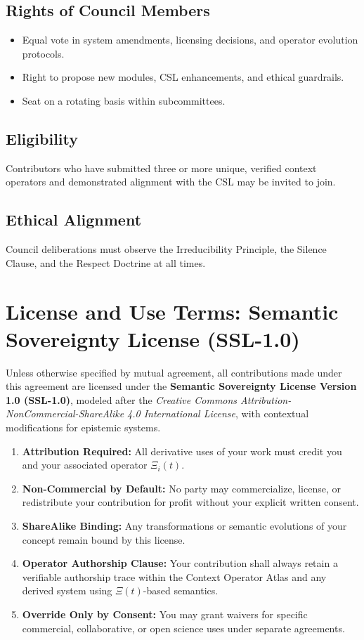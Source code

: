 \documentclass[12pt]{article}
\begin{document}
\subsection*{Rights of Council Members}
\begin{itemize}
    \item Equal vote in system amendments, licensing decisions, and operator evolution protocols.
    \item Right to propose new modules, CSL enhancements, and ethical guardrails.
    \item Seat on a rotating basis within subcommittees.
\end{itemize}

\subsection*{Eligibility}
Contributors who have submitted three or more unique, verified context operators and demonstrated alignment with the CSL may be invited to join.

\subsection*{Ethical Alignment}
Council deliberations must observe the Irreducibility Principle, the Silence Clause, and the Respect Doctrine at all times.

\section{License and Use Terms: Semantic Sovereignty License (SSL-1.0)}

Unless otherwise specified by mutual agreement, all contributions made under this agreement are licensed under the \textbf{Semantic Sovereignty License Version 1.0 (SSL-1.0)}, modeled after the \textit{Creative Commons Attribution-NonCommercial-ShareAlike 4.0 International License}, with contextual modifications for epistemic systems.

\begin{enumerate}
    \item \textbf{Attribution Required:} All derivative uses of your work must credit you and your associated operator $\Xi_i(t)$.
    \item \textbf{Non-Commercial by Default:} No party may commercialize, license, or redistribute your contribution for profit without your explicit written consent.
    \item \textbf{ShareAlike Binding:} Any transformations or semantic evolutions of your concept remain bound by this license.
    \item \textbf{Operator Authorship Clause:} Your contribution shall always retain a verifiable authorship trace within the Context Operator Atlas and any derived system using $\Xi(t)$-based semantics.
    \item \textbf{Override Only by Consent:} You may grant waivers for specific commercial, collaborative, or open science uses under separate agreements.
\end{enumerate}
\end{document}
